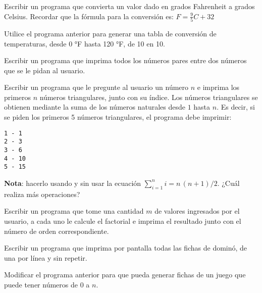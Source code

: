 \begin{ejercicio}
Escribir un programa que convierta un valor dado en grados Fahrenheit a
grados Celsius.  Recordar que la fórmula para la conversión es:
$F = \frac{9}{5}C+32$
\end{ejercicio}

\begin{ejercicio}
Utilice el programa anterior para generar una tabla de conversión de
temperaturas, desde 0 °F hasta 120 °F, de 10 en 10.
\end{ejercicio}

\begin{ejercicio}
Escribir un programa que imprima todos los números pares entre dos números
que se le pidan al usuario.
\end{ejercicio}

\begin{ejercicio}
Escribir un programa que le pregunte al usuario un número $n$
e imprima los primeros $n$ números triangulares, junto con su
índice. Los números triangulares se obtienen mediante la suma de los números
naturales desde $1$ hasta $n$.  Es decir, si se piden los primeros 5
números triangulares, el programa debe imprimir:

\begin{verbatim}
1 - 1
2 - 3
3 - 6
4 - 10
5 - 15
\end{verbatim}

{\bf Nota}: hacerlo usando y sin usar la ecuación $\sum_{i=1}^n i = n\,(n+1)/2$.
¿Cuál realiza más operaciones?
\end{ejercicio}

\begin{ejercicio}
Escribir un programa que tome una cantidad $m$ de valores ingresados
por el usuario, a cada uno le calcule el factorial e imprima el resultado
junto con el número de orden correspondiente.
\end{ejercicio}

\begin{ejercicio}
Escribir un programa que imprima por pantalla todas las fichas de dominó, de
una por línea y sin repetir.
\end{ejercicio}

\begin{ejercicio}
Modificar el programa anterior para que pueda generar fichas de un juego
que puede tener números de 0 a $n$.
\end{ejercicio}
